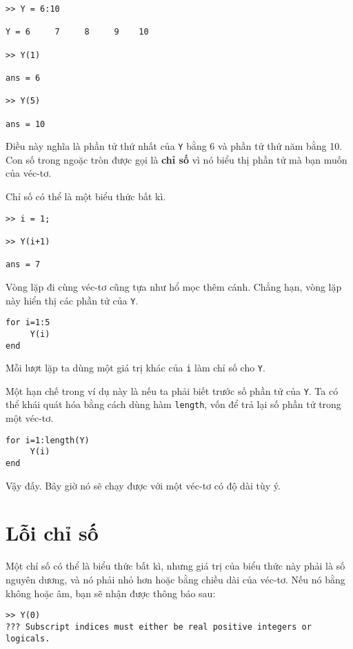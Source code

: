 \documentclass[12pt]{book}
\begin{document}
\begin{verbatim}
>> Y = 6:10

Y = 6     7     8     9    10

>> Y(1)

ans = 6

>> Y(5)

ans = 10
\end{verbatim}

Điều này nghĩa là phần tử thứ nhất của {\tt Y} bằng 6 và
phần tử thứ năm bằng 10. Con số trong ngoặc tròn được gọi
là {\bf chỉ số} vì nó biểu thị phần tử mà bạn muốn của
véc-tơ.

Chỉ số có thể là một biểu thức bất kì.

\begin{verbatim}
>> i = 1;

>> Y(i+1)

ans = 7
\end{verbatim}

Vòng lặp đi cùng véc-tơ cũng tựa như hổ mọc thêm cánh.
Chẳng hạn, vòng lặp này hiển thị các phần tử của {\tt Y}.

\begin{verbatim}
for i=1:5
     Y(i)
end
\end{verbatim}

Mỗi lượt lặp ta dùng một giá trị khác của {\tt i} làm chỉ số
cho {\tt Y}.

Một hạn chế trong ví dụ này là nếu ta phải biết trước số
phần tử của {\tt Y}. Ta có thể khái quát hóa bằng cách dùng
hàm {\tt length}, vốn để trả lại số phần tử trong một véc-tơ.

\begin{verbatim}
for i=1:length(Y)
     Y(i)
end
\end{verbatim}

Vậy đấy. Bây giờ nó sẽ chạy được với một véc-tơ có độ dài tùy ý.


\section{Lỗi chỉ số}

Một chỉ số có thể là biểu thức bất kì, nhưng giá trị của 
biểu thức này phải là số nguyên dương, và nó phải nhỏ hơn
hoặc bằng chiều dài của véc-tơ. Nếu nó bằng không hoặc âm,
bạn sẽ nhận được thông báo sau:

\begin{verbatim}
>> Y(0)
??? Subscript indices must either be real positive integers or
logicals.
\end{verbatim}
\end{document}
